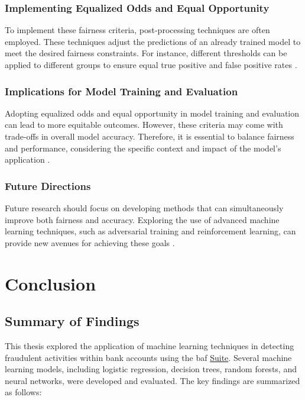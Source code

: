 \documentclass[12pt,a4paper]{report}
\begin{document}
\subsection{Implementing Equalized Odds and Equal Opportunity}
To implement these fairness criteria, post-processing techniques are often employed. These techniques adjust the predictions of an already trained model to meet the desired fairness constraints. For instance, different thresholds can be applied to different groups to ensure equal true positive and false positive rates \citep{hardt2016equality}.\\

\subsection{Implications for Model Training and Evaluation}
Adopting equalized odds and equal opportunity in model training and evaluation can lead to more equitable outcomes. However, these criteria may come with trade-offs in overall model accuracy. Therefore, it is essential to balance fairness and performance, considering the specific context and impact of the model's application \citep{hardt2016equality}.\\

\subsection{Future Directions}
Future research should focus on developing methods that can simultaneously improve both fairness and accuracy. Exploring the use of advanced machine learning techniques, such as adversarial training and reinforcement learning, can provide new avenues for achieving these goals \citep{hardt2016equality}.\\





\chapter{Conclusion}
\section{Summary of Findings}
This thesis explored the application of machine learning techniques in detecting fraudulent activities within bank accounts using the \acrshort{baf} \href{https://www.kaggle.com/datasets/sgpjesus/bank-account-fraud-dataset-neurips-2022/code}{Suite}. Several machine learning models, including logistic regression, decision trees, random forests, and neural networks, were developed and evaluated. The key findings are summarized as follows:
\end{document}
